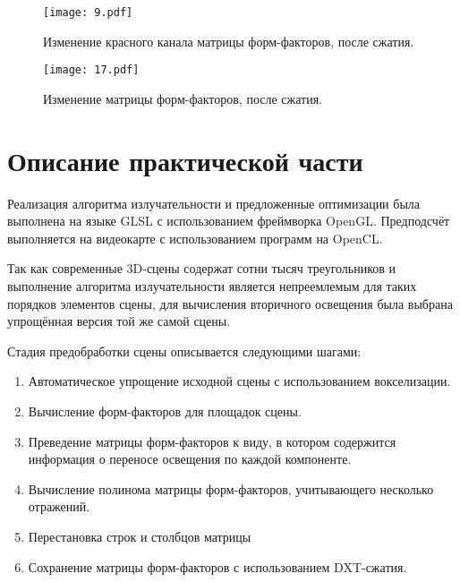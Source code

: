 \documentclass[12pt,fleqn]{article}
\begin{document}
\begin{figure}[htb]
    \centering
    \texttt{[image: 9.pdf]}
    \caption{Изменение красного канала матрицы форм-факторов, после сжатия.}
    \label{red_comparison}
\end{figure}

\begin{figure}[htb]
    \centering
    \texttt{[image: 17.pdf]}
    \caption{Изменение матрицы форм-факторов, после сжатия.}
    \label{rgb_comparison}
\end{figure}

\pagebreak

\section{Описание практической части}

Реализация алгоритма излучательности и предложенные оптимизации была выполнена на языке GLSL с использованием фреймворка OpenGL. Предподсчёт выполняется на видеокарте с использованием программ на OpenCL. 

Так как современные 3D-сцены содержат сотни тысяч треугольников и выполнение алгоритма излучательности является непреемлемым для таких порядков элементов сцены, для вычисления вторичного освещения была выбрана упрощённая версия той же самой сцены.

Стадия предобработки сцены описывается следующими шагами:

\begin{enumerate}

\item Автоматическое упрощение исходной сцены с использованием вокселизации.

\item Вычисление форм-факторов для площадок сцены.

\item Преведение матрицы форм-факторов к виду, в котором содержится информация о переносе освещения по каждой компоненте.

\item Вычисление полинома матрицы форм-факторов, учитывающего несколько отражений.

\item Перестановка строк и столбцов матрицы

\item Сохранение матрицы форм-факторов с использованием DXT-сжатия.

\end{enumerate}
\end{document}
